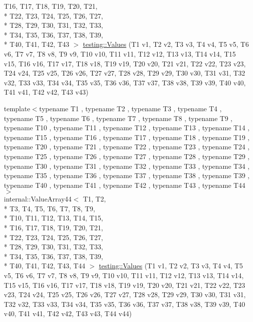 \begin{DoxyCompactItemize}
T16, T17, T18, T19, T20, T21, \\*
T22, T23, T24, T25, T26, T27, \\*
T28, T29, T30, T31, T32, T33, \\*
T34, T35, T36, T37, T38, T39, \\*
T40, T41, T42, T43 $>$ \hyperlink{namespacetesting_a316b2e13e635215ac89a50315bb66d81}{testing\-::\-Values} (T1 v1, T2 v2, T3 v3, T4 v4, T5 v5, T6 v6, T7 v7, T8 v8, T9 v9, T10 v10, T11 v11, T12 v12, T13 v13, T14 v14, T15 v15, T16 v16, T17 v17, T18 v18, T19 v19, T20 v20, T21 v21, T22 v22, T23 v23, T24 v24, T25 v25, T26 v26, T27 v27, T28 v28, T29 v29, T30 v30, T31 v31, T32 v32, T33 v33, T34 v34, T35 v35, T36 v36, T37 v37, T38 v38, T39 v39, T40 v40, T41 v41, T42 v42, T43 v43)
\item 
{\footnotesize template$<$typename T1 , typename T2 , typename T3 , typename T4 , typename T5 , typename T6 , typename T7 , typename T8 , typename T9 , typename T10 , typename T11 , typename T12 , typename T13 , typename T14 , typename T15 , typename T16 , typename T17 , typename T18 , typename T19 , typename T20 , typename T21 , typename T22 , typename T23 , typename T24 , typename T25 , typename T26 , typename T27 , typename T28 , typename T29 , typename T30 , typename T31 , typename T32 , typename T33 , typename T34 , typename T35 , typename T36 , typename T37 , typename T38 , typename T39 , typename T40 , typename T41 , typename T42 , typename T43 , typename T44 $>$ }\\internal\-::\-Value\-Array44$<$ T1, T2, \\*
T3, T4, T5, T6, T7, T8, T9, \\*
T10, T11, T12, T13, T14, T15, \\*
T16, T17, T18, T19, T20, T21, \\*
T22, T23, T24, T25, T26, T27, \\*
T28, T29, T30, T31, T32, T33, \\*
T34, T35, T36, T37, T38, T39, \\*
T40, T41, T42, T43, T44 $>$ \hyperlink{namespacetesting_a42848f3794e196c5a74f4b21db0752dd}{testing\-::\-Values} (T1 v1, T2 v2, T3 v3, T4 v4, T5 v5, T6 v6, T7 v7, T8 v8, T9 v9, T10 v10, T11 v11, T12 v12, T13 v13, T14 v14, T15 v15, T16 v16, T17 v17, T18 v18, T19 v19, T20 v20, T21 v21, T22 v22, T23 v23, T24 v24, T25 v25, T26 v26, T27 v27, T28 v28, T29 v29, T30 v30, T31 v31, T32 v32, T33 v33, T34 v34, T35 v35, T36 v36, T37 v37, T38 v38, T39 v39, T40 v40, T41 v41, T42 v42, T43 v43, T44 v44)
\item 

\end{DoxyCompactItemize}

